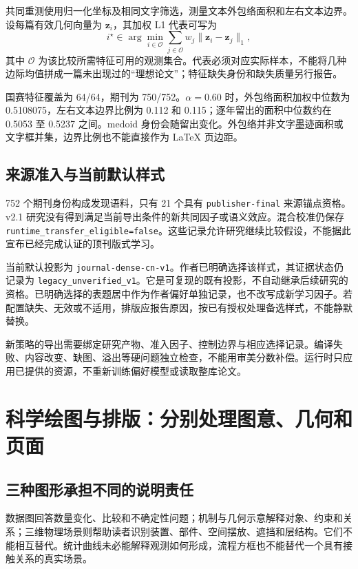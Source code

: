 \documentclass[UTF8,a4paper,zihao=-4,fontset=fandol]{ctexart}
\newcommand{\code}[1]{\texttt{\small #1}}
\begin{document}
共同重测使用归一化坐标及相同文字筛选，测量文本外包络面积和左右文本边界。设每篇有效几何向量为 $\boldsymbol z_i$，其加权 L1 代表可写为
\begin{equation}
i^\star\in\arg\min_{i\in\mathcal O}\sum_{j\in\mathcal O}
w_j\lVert\boldsymbol z_i-\boldsymbol z_j\rVert_1,
\label{eq:medoid}
\end{equation}
其中 $\mathcal O$ 为该比较所需特征可用的观测集合。代表必须对应实际样本，不能将几种边际均值拼成一篇未出现过的“理想论文”；特征缺失身份和缺失质量另行报告。

国赛特征覆盖为 64/64，期刊为 750/752。$\alpha=0.60$ 时，外包络面积加权中位数为 0.5108075，左右文本边界比例为 0.112 和 0.115；逐年留出的面积中位数约在 0.5053 至 0.5237 之间。medoid 身份会随留出变化。外包络并非文字墨迹面积或文字框并集，边界比例也不能直接作为 LaTeX 页边距\cite{layoutcal}。

\subsection{来源准入与当前默认样式}

752 个期刊身份构成发现语料，只有 21 个具有 \code{publisher-final} 来源锚点资格。v2.1 研究没有得到满足当前导出条件的新共同因子或语义效应。混合校准仍保存 \code{runtime\_transfer\_eligible=false}。这些记录允许研究继续比较假设，不能据此宣布已经完成认证的顶刊版式学习\cite{architecture,layout}。

当前默认投影为 \code{journal-dense-cn-v1}。作者已明确选择该样式，其证据状态仍记录为 \code{legacy\_unverified\_v1}。它是可复现的既有投影，不自动继承后续研究的资格。已明确选择的表题居中作为作者偏好单独记录，也不改写成新学习因子。若配置缺失、无效或不适用，排版应报告原因，按已有授权处理备选样式，不能静默替换。

新策略的导出需要绑定研究产物、准入因子、控制边界与相应选择记录。编译失败、内容改变、缺图、溢出等硬问题独立检查，不能用审美分数补偿。运行时只应用已提供的资源，不重新训练偏好模型或读取整库论文。

\section{科学绘图与排版：分别处理图意、几何和页面}

\subsection{三种图形承担不同的说明责任}

数据图回答数量变化、比较和不确定性问题；机制与几何示意解释对象、约束和关系；三维物理场景则帮助读者识别装置、部件、空间摆放、遮挡和层结构。它们不能相互替代。统计曲线未必能解释观测如何形成，流程方框也不能替代一个具有接触关系的真实场景。
\end{document}
